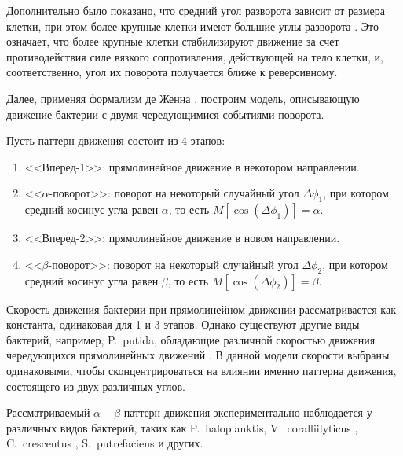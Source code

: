 Дополнительно было показано, что средний угол разворота зависит от размера клетки, при этом более крупные клетки имеют большие углы разворота \cite{taute_high-throughput_2015}. Это означает, что более крупные клетки стабилизируют движение за счет противодействия силе вязкого сопротивления, действующей на тело клетки, и, соответственно, угол их поворота получается ближе к реверсивному. 

Далее, применяя формализм де Женна \cite{de_gennes_chemotaxis_2004}, построим модель, описывающую движение бактерии с двумя чередующимися событиями поворота.

Пусть паттерн движения состоит из 4 этапов: 
\begin{enumerate}
  \item <<Вперед-1>>: прямолинейное движение в некотором направлении.
  \item <<$\alpha$-поворот>>: поворот на некоторый случайный угол $\Delta\phi_1$, при котором средний косинус угла равен $\alpha$, то есть $M\left [\cos (\Delta\phi_1) \right ]=\alpha$.
  \item <<Вперед-2>>: прямолинейное движение в новом направлении.
  \item <<$\beta$-поворот>>: поворот на некоторый случайный угол $\Delta\phi_2$, при котором средний косинус угла равен $\beta$, то есть $M\left [\cos (\Delta\phi_2) \right ]=\beta$.
\end{enumerate}

Скорость движения бактерии при прямолинейном движении рассматривается как константа, одинаковая для 1 и 3 этапов. Однако существуют другие виды бактерий, например, P.~putida, обладающие различной скоростью движения чередующихся прямолинейных движений \cite{theves_bacterial_2013}. В данной модели скорости выбраны одинаковыми, чтобы сконцентрироваться на влиянии именно паттерна движения, состоящего из двух различных углов.

Рассматриваемый $\alpha-\beta$ паттерн движения экспериментально наблюдается у различных видов бактерий, таких как P.~haloplanktis, V.~coralliilyticus \cite{son_bacteria_2013}, C.~crescentus \cite{liu_helical_2014}, S.~putrefaciens \cite{stocker_reverse_2011} и других. 

